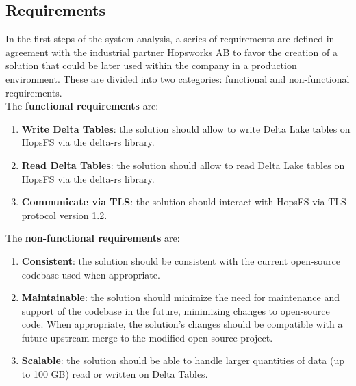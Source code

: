 \subsection{Requirements}
\label{subsec:requirements}
In the first steps of the system analysis, a series of requirements are defined in agreement with the industrial partner Hopsworks \gls{AB} to favor the creation of a solution that could be later used within the company in a production environment. These are divided into two categories: functional and non-functional requirements. \\ The \textbf{functional requirements} are:
\begin{enumerate}
    \item \textbf{Write Delta Tables}: the solution should allow to write Delta Lake tables on \gls{HopsFS} via the delta-rs library.
    \item \textbf{Read Delta Tables}: the solution should allow to read Delta Lake tables on \gls{HopsFS} via the delta-rs library.
    \item \textbf{Communicate via TLS}: the solution should interact with \gls{HopsFS} via \gls{TLS} protocol version 1.2.
\end{enumerate}
The \textbf{non-functional requirements} are:
\begin{enumerate}
    \item \textbf{Consistent}: the solution should be consistent with the current open-source codebase used when appropriate.
    \item \textbf{Maintainable}: the solution should minimize the need for maintenance and support of the codebase in the future, minimizing changes to open-source code. When appropriate, the solution's changes should be compatible with a future upstream merge to the modified open-source project.
    \item \textbf{Scalable}: the solution should be able to handle larger quantities of data (up to 100 GB) read or written on Delta Tables.
\end{enumerate}

